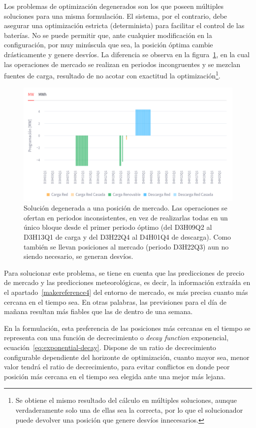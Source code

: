 Los problemas de optimización degenerados son los que poseen múltiples soluciones para una misma formulación. El sistema, por el contrario, debe asegurar una optimización estricta (determinista) para facilitar el control de las baterías. No se puede permitir que, ante cualquier modificación en la configuración, por muy minúscula que sea, la posición óptima cambie drásticamente y genere desvíos. La diferencia se observa en la figura~\ref{fig:solucion-degenerada}, en la cual las operaciones de mercado se realizan en periodos incongruentes y se mezclan fuentes de carga, resultado de no acotar con exactitud la optimización\footnote{Se obtiene el mismo resultado del cálculo en múltiples soluciones, aunque verdaderamente solo una de ellas sea la correcta, por lo que el solucionador puede devolver una posición que genere desvíos innecesarios.}.

\begin{figure}
  \centering
  \includegraphics[width=0.75\linewidth]{figures/solucion-degenerada.png}
  \caption[Solución degenerada.]{Solución degenerada a una posición de mercado. Las operaciones se ofertan en periodos inconsistentes, en vez de realizarlas todas en un único bloque desde el primer periodo óptimo (del D3H09Q2 al D3H13Q1 de carga y del D3H22Q4 al D4H01Q4 de descarga). Como también se llevan posiciones al mercado (periodo D3H22Q3) aun no siendo necesario, se generan desvíos.}
  \label{fig:solucion-degenerada}
\end{figure}

Para solucionar este problema, se tiene en cuenta que las predicciones de precio de mercado y las predicciones meteorológicas, es decir, la información extraída en el apartado~\ref{makereference4} del entorno de mercado, es más precisa cuanto más cercana en el tiempo sea. En otras palabras, las previsiones para el día de mañana resultan más fiables que las de dentro de una semana.

En la formulación, esta preferencia de las posiciones más cercanas en el tiempo se representa con una función de decrecimiento o \textit{decay function} exponencial, ecuación~\ref{eq:exponential-decay}. Dispone de un ratio de decrecimiento configurable dependiente del horizonte de optimización, cuanto mayor sea, menor valor tendrá el ratio de decrecimiento, para evitar conflictos en donde peor posición más cercana en el tiempo sea elegida ante una mejor más lejana.


